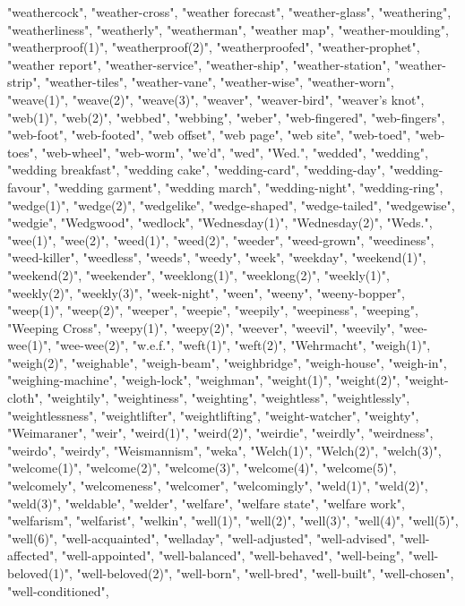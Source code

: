 "weathercock",
"weather-cross",
"weather forecast",
"weather-glass",
"weathering",
"weatherliness",
"weatherly",
"weatherman",
"weather map",
"weather-moulding",
"weatherproof(1)",
"weatherproof(2)",
"weatherproofed",
"weather-prophet",
"weather report",
"weather-service",
"weather-ship",
"weather-station",
"weather-strip",
"weather-tiles",
"weather-vane",
"weather-wise",
"weather-worn",
"weave(1)",
"weave(2)",
"weave(3)",
"weaver",
"weaver-bird",
"weaver's knot",
"web(1)",
"web(2)",
"webbed",
"webbing",
"weber",
"web-fingered",
"web-fingers",
"web-foot",
"web-footed",
"web offset",
"web page",
"web site",
"web-toed",
"web-toes",
"web-wheel",
"web-worm",
"we'd",
"wed",
"Wed.",
"wedded",
"wedding",
"wedding breakfast",
"wedding cake",
"wedding-card",
"wedding-day",
"wedding-favour",
"wedding garment",
"wedding march",
"wedding-night",
"wedding-ring",
"wedge(1)",
"wedge(2)",
"wedgelike",
"wedge-shaped",
"wedge-tailed",
"wedgewise",
"wedgie",
"Wedgwood",
"wedlock",
"Wednesday(1)",
"Wednesday(2)",
"Weds.",
"wee(1)",
"wee(2)",
"weed(1)",
"weed(2)",
"weeder",
"weed-grown",
"weediness",
"weed-killer",
"weedless",
"weeds",
"weedy",
"week",
"weekday",
"weekend(1)",
"weekend(2)",
"weekender",
"weeklong(1)",
"weeklong(2)",
"weekly(1)",
"weekly(2)",
"weekly(3)",
"week-night",
"ween",
"weeny",
"weeny-bopper",
"weep(1)",
"weep(2)",
"weeper",
"weepie",
"weepily",
"weepiness",
"weeping",
"Weeping Cross",
"weepy(1)",
"weepy(2)",
"weever",
"weevil",
"weevily",
"wee-wee(1)",
"wee-wee(2)",
"w.e.f.",
"weft(1)",
"weft(2)",
"Wehrmacht",
"weigh(1)",
"weigh(2)",
"weighable",
"weigh-beam",
"weighbridge",
"weigh-house",
"weigh-in",
"weighing-machine",
"weigh-lock",
"weighman",
"weight(1)",
"weight(2)",
"weight-cloth",
"weightily",
"weightiness",
"weighting",
"weightless",
"weightlessly",
"weightlessness",
"weightlifter",
"weightlifting",
"weight-watcher",
"weighty",
"Weimaraner",
"weir",
"weird(1)",
"weird(2)",
"weirdie",
"weirdly",
"weirdness",
"weirdo",
"weirdy",
"Weismannism",
"weka",
"Welch(1)",
"Welch(2)",
"welch(3)",
"welcome(1)",
"welcome(2)",
"welcome(3)",
"welcome(4)",
"welcome(5)",
"welcomely",
"welcomeness",
"welcomer",
"welcomingly",
"weld(1)",
"weld(2)",
"weld(3)",
"weldable",
"welder",
"welfare",
"welfare state",
"welfare work",
"welfarism",
"welfarist",
"welkin",
"well(1)",
"well(2)",
"well(3)",
"well(4)",
"well(5)",
"well(6)",
"well-acquainted",
"welladay",
"well-adjusted",
"well-advised",
"well-affected",
"well-appointed",
"well-balanced",
"well-behaved",
"well-being",
"well-beloved(1)",
"well-beloved(2)",
"well-born",
"well-bred",
"well-built",
"well-chosen",
"well-conditioned",

